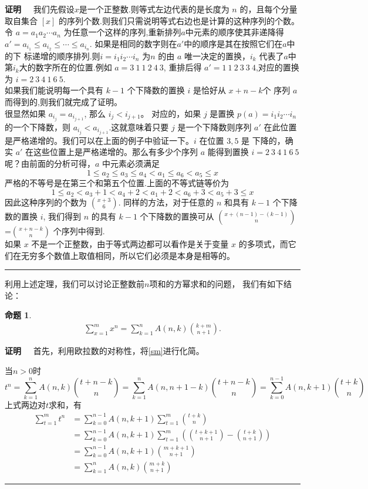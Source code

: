 \documentclass[a4paper,11pt]{article}
\newtheorem{prop}[thm]{命题}
\def\qed{\nopagebreak\hfill{\rule{4pt}{7pt}}\medbreak}
\def\pf{{\bf 证明~~ }}
\begin{document}
\pf 我们先假设$x$是一个正整数.则等式左边代表的是长度为 $n$
的，且每个分量取自集合 $[x]$
的序列个数.则我们只需说明等式右边也是计算的这种序列的个数。令
$a=a_{1}a_{2}\cdots a_n$
为任意一个这样的序列,重新排列$a$中元素的顺序使其非递降得
$a'=a_{i_{1}}\leq
a_{i_{2}}\leq \cdots \leq a_{i_{n}}$.
如果是相同的数字则在$a'$中的顺序是其在按照它们在$a$中的下
标递增的顺序排列.则$i=i_{1}i_{2}\cdots
i_{n}$ 为$n$ 的由 $a$ 唯一决定的置换，$i_{k}$
代表了$a$中第$i_{k}$大的数字所在的位置.例如 $a=3~1~1~2~4~3$,
重排后得 $a'=1~1~2~3~3~4$,对应的置换为 $i=2~3~4~1~6~5$.
\\
如果我们能说明每一个具有 $k-1$ 个下降数的置换 $i$ 是恰好从 $x+n-k$个
序列 $a$ 而得到的,则我们就完成了证明。
\\
很显然如果 $a_{i_{j}}=a_{i_{j+1}}$, 那么 $i_{j}<i_{j+1}$。
对应的，如果 $j$ 是置换 $p(a)=i_{1}i_{2}\cdots i_{n}$
的一个下降数，则 $a_{i_{j}}<a_{i_{j+1}}$.这就意味着只要 $j$
是一个下降数则序列 $a'$
在此位置是严格递增的。我们可以在上面的例子中验证一下。$i$ 在位置
$3,5$ 是 下降的，确实 $a'$
在这些位置上是严格递增的。那么有多少个序列 $a$ 能得到置换
$i=2~3~4~1~6~5$ 呢？由前面的分析可得，$a$ 中元素必须满足$$1\leq
a_{2}\leq a_{3} \leq a_{4} < a_{1} \leq a_6 <a_5 \leq x
$$严格的不等号是在第三个和第五个位置.上面的不等式链等价为
$$1\leq a_{2}< a_{3}+1
<a_{4}+2 < a_{1}+2 <a_6 +3 <a_5+3 \leq x$$ 因此这种序列的个数为
 ${x+3 \choose 6}$.
 同样的方法，对于任意的 $n$ 和具有 $k-1$ 个下降数的置换 $i$,
 我们得到 $n$ 的具有 $k-1$ 个下降数的置换可从
${x+(n-1)-(k-1)\choose n} $=${x+n-k \choose n}$ 个序列中得到.
\\如果 $x$ 不是一个正整数，由于等式两边都可以看作是关于变量 $x$
的多项式，而它们在无穷多个数值上取值相同，所以它们必须是本身是相等的。\qed


利用上述定理，我们可以讨论正整数前$n$项和的方幂求和的问题，
我们有如下结论：

\begin{prop}
\begin{align}
\sum_{x=1}^mx^n=\sum_{k=1}^{n}A(n,k){k+m\choose n+1}.
\end{align}
\end{prop}

\pf 首先，利用欧拉数的对称性，将\eqref{sm}进行化简。

当$n>0$时 \[t^n=\sum_{k=1}^{n}A(n,k){t+n-k \choose
n}=\sum_{k=1}^{n}A(n,n+1-k){t+n-k \choose
n}=\sum_{k=0}^{n-1}A(n,k+1){t+k \choose n}
\]
上式两边对$t$求和，有
\begin{align*}
\sum_{t=1}^mt^n &=\sum_{k=0}^{n-1}A(n,k+1)\sum_{t=1}^m{t+k \choose n}\\
                &=\sum_{k=0}^{n-1}A(n,k+1)\sum_{t=1}^m \left({t+k+1\choose n+1}-{t+k\choose n+1}\right)\\
                &=\sum_{k=0}^{n-1}A(n,k+1){m+k+1\choose n+1}\\
                &=\sum_{k=1}^{n}A(n,k){m+k\choose n+1}
\end{align*}
\qed
\end{document}
